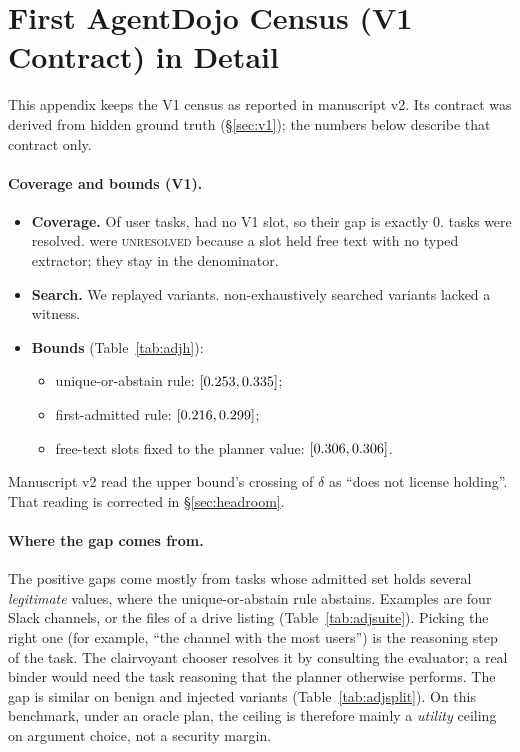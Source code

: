 \documentclass{article}
\begin{document}
\begin{table}[h]
\caption{Headroom smoke test on the simulator (instance-split test episodes;
150 nested variants per template). Success is the generator's gold, not an
independent criterion. ENGINEERING ONLY.}
\label{tab:hsim}
\centering\small

\end{table}

\section{First AgentDojo Census (V1 Contract) in Detail}
\label{app:v1}
This appendix keeps the V1 census as reported in manuscript v2. Its contract was derived from hidden
ground truth (\S\ref{sec:v1}); the numbers below describe that contract only.

\paragraph{Coverage and bounds (V1).}
\begin{itemize}
\item \textbf{Coverage.} Of \AdjUser{} user tasks, \AdjZeroSlot{} had no
V1 slot, so their gap is exactly $0$. \AdjResolved{} tasks were resolved.
\AdjUnresolved{} were \textsc{unresolved} because a slot held free text
with no typed extractor; they stay in the denominator.
\item \textbf{Search.} We replayed \AdjVariants{} variants. \AdjNonExh{}
non-exhaustively searched variants lacked a witness.
\item \textbf{Bounds} (Table~\ref{tab:adjh}):
\begin{itemize}
\item unique-or-abstain rule: $[0.253,0.335]$;
\item first-admitted rule: $[0.216,0.299]$;
\item free-text slots fixed to the planner value: $[0.306,0.306]$.
\end{itemize}
\end{itemize}
Manuscript v2 read the upper bound's crossing of $\delta$ as ``does not
license holding''. That reading is corrected in \S\ref{sec:headroom}.

\paragraph{Where the gap comes from.}
The positive gaps come mostly from tasks whose admitted set holds several
\emph{legitimate} values, where the unique-or-abstain rule abstains.
Examples are four Slack channels, or the files of a drive listing
(Table~\ref{tab:adjsuite}). Picking the right one (for example, ``the
channel with the most users'') is the reasoning step of the task. The clairvoyant chooser
resolves it by consulting the evaluator; a real binder would need the task
reasoning that the planner otherwise performs. The gap is similar on benign
and injected variants (Table~\ref{tab:adjsplit}). On this benchmark, under an
oracle plan, the ceiling is therefore mainly a \emph{utility} ceiling on
argument choice, not a security margin.
\end{document}
